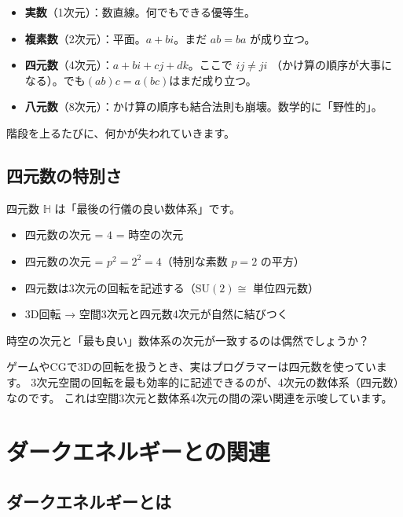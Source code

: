 \documentclass[12pt,a4paper]{article}
\begin{document}
\begin{analogy}[数の階段]
\begin{itemize}
  \item \textbf{実数}（1次元）：数直線。何でもできる優等生。
  \item \textbf{複素数}（2次元）：平面。$a + bi$。まだ $ab = ba$ が成り立つ。
  \item \textbf{四元数}（4次元）：$a + bi + cj + dk$。ここで $ij \neq ji$
    （かけ算の順序が大事になる）。でも$(ab)c = a(bc)$はまだ成り立つ。
  \item \textbf{八元数}（8次元）：かけ算の順序も結合法則も崩壊。数学的に「野性的」。
\end{itemize}
階段を上るたびに、何かが失われていきます。
\end{analogy}

\subsection{四元数の特別さ}

四元数 $\mathbb{H}$ は「最後の行儀の良い数体系」です。

\begin{keypoint}[四元数と時空]
\begin{itemize}
  \item 四元数の次元 = $4$ = 時空の次元
  \item 四元数の次元 = $p^2 = 2^2 = 4$（特別な素数 $p=2$ の平方）
  \item 四元数は3次元の回転を記述する（$\mathrm{SU}(2) \cong$ 単位四元数）
  \item 3D回転 → 空間3次元と四元数4次元が自然に結びつく
\end{itemize}
時空の次元と「最も良い」数体系の次元が一致するのは偶然でしょうか？
\end{keypoint}

ゲームやCGで3Dの回転を扱うとき、実はプログラマーは四元数を使っています。
3次元空間の回転を最も効率的に記述できるのが、4次元の数体系（四元数）なのです。
これは空間3次元と数体系4次元の間の深い関連を示唆しています。

\section{ダークエネルギーとの関連}

\subsection{ダークエネルギーとは}
\end{document}
